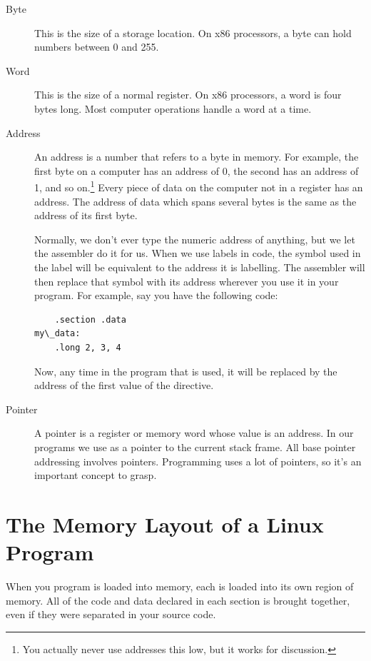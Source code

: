 \begin{description}
\item[Byte] This is the size of a storage location.  On x86 processors, a byte
can hold numbers between 0 and 255.
\item[Word] This is the size of a normal register.  On x86 processors, a word
is four bytes long.  Most computer operations handle a word at a time.
\item[Address] An address is a number that refers to a byte in memory.  For example, the first
byte on a computer has an address of 0, the second has
an address of 1, and so on.\footnote{You actually never use
addresses this low, but it works for discussion.}
Every piece of data on the computer not in a register has an address.
The address of data which spans several bytes is the same as the address
of its first byte.

Normally, we don't ever type the numeric address of anything, but we let the
assembler do it for us.  When we use labels in code, the
symbol used in the label will be equivalent to the address it is labelling.  The assembler
will then replace that symbol with its address wherever you use it in 
your program.  For example, say you have the following code:

\begin{simpletyping}
\begin{lstlisting}
	.section .data
my\_data:
	.long 2, 3, 4
\end{lstlisting}
\end{simpletyping}

Now, any time in the program that  is used, 
it will be replaced by the address of the first value of the 
directive.
\item[Pointer] A pointer is a register or memory word whose value is an 
address.  In our programs we use \icode{{\ebpBare}} as a pointer
to the current stack frame.  All base pointer addressing involves pointers.
Programming uses a lot of pointers, so
it's an important concept to grasp.
\end{description}

\section{The Memory Layout of a Linux Program}

When you program is loaded into memory, each 
is loaded into its own region of memory.  All of the code and data declared
in each section is brought together, even if they were separated in your
source code.

